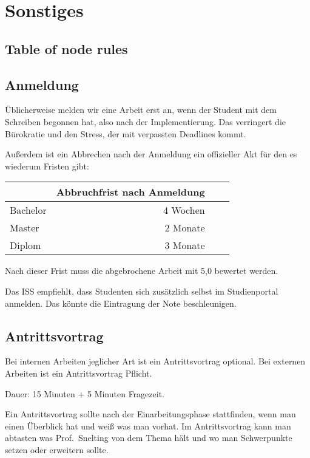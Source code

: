 \chapter{Sonstiges}

\section{Table of node rules}
\label{table_of_rules}


\section{Anmeldung}

Üblicherweise melden wir eine Arbeit erst an,
wenn der Student mit dem Schreiben begonnen hat,
also nach der Implementierung.
Das verringert die Bürokratie und den Stress,
der mit verpassten Deadlines kommt.

Außerdem ist ein Abbrechen nach der Anmeldung ein offizieller Akt
für den es wiederum Fristen gibt:

\begin{center}
\begin{tabular}{lrrr}
\toprule
 & Abbruchfrist nach Anmeldung \\
\midrule
Bachelor      & 4 Wochen \\
Master        & 2 Monate \\
Diplom        & 3 Monate \\
\bottomrule
\end{tabular}
\end{center}

Nach dieser Frist muss die abgebrochene Arbeit mit 5,0 bewertet werden.

Das ISS empfiehlt, dass Studenten sich zusätzlich selbst im Studienportal anmelden.
Das könnte die Eintragung der Note beschleunigen.

\section{Antrittsvortrag}

Bei internen Arbeiten jeglicher Art ist ein Antrittsvortrag optional.
Bei externen Arbeiten ist ein Antrittsvortrag Pflicht.

Dauer: 15 Minuten + 5 Minuten Fragezeit.

Ein Antrittsvortrag sollte nach der Einarbeitungsphase stattfinden,
wenn man einen Überblick hat und weiß was man vorhat.
Im Antrittsvortrag kann man abtasten was Prof.~Snelting von dem Thema hält
und wo man Schwerpunkte setzen oder erweitern sollte.

